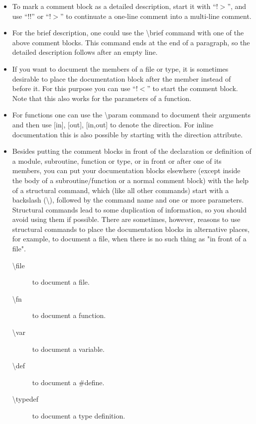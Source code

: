 \documentclass[12pt,letterpaper]{article}
\begin{document}
\begin{itemize}
\item  To mark a comment block as a detailed description, start it with ``!$>$'', and use ``!!'' or ``!$>$'' to continuate a one-line comment into a multi-line comment.
\item For the brief description, one could use the \textbackslash brief command with one of the above comment blocks. This command ends at the end of a paragraph, so the detailed description follows after an empty line.
\item If you want to document the members of a file or type, it is sometimes desirable to place the documentation block after the member instead of before it. For this purpose you can use ``!$<$'' to start the comment block. Note that this also works for the parameters of a function.
\item For functions one can use the \textbackslash param command to document their arguments and then use [in], [out], [in,out] to denote the direction. For inline documentation this is also possible by starting with the direction attribute.
\item Besides putting the comment blocks in front of the declaration or definition of a module, subroutine, function or type, or in front or after one of its members, you can put your documentation blocks elsewhere (except inside the body of a subroutine/function or a normal comment block) with the help of a structural command, which (like all other commands) start with a backslash (\textbackslash), followed by the command name and one or more parameters. Structural commands lead to some duplication of information, so you should avoid using them if possible. There are sometimes, however, reasons to use structural commands to place the documentation blocks in alternative places, for example, to document a file, when there is no such thing as "in front of a file".
\begin{description}
\item[\textbackslash file] to document a file.
\item[\textbackslash fn] to document a function.
\item[\textbackslash var] to document a variable.
\item[\textbackslash def] to document a \#define.
\item[\textbackslash typedef] to document a type definition.
\end{description}
\end{itemize}
\end{document}
